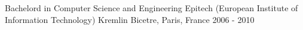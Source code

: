 

\begin{cventries}


  \cventry
    {Bachelord in Computer Science and Engineering} %
    {Epitech (European Institute of Information Technology)} %
    {Kremlin Bicetre, Paris, France} %
    {2006 - 2010} %
    {
      \begin{cvitems} %
      \end{cvitems}
    }

\end{cventries}
